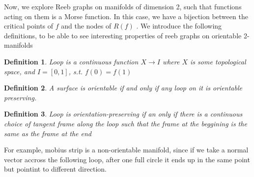 \documentclass[]{article}
\newtheorem{definition}{Definition}
\begin{document}



Now, we explore Reeb graphs on manifolds of dimension 2, such that functions acting on them is a Morse function. In this case, we have a bijection between the critical points of $f$ and the nodes of $R(f)$ . We introduce the following definitions, to be able to see interesting properties of reeb graphs on orientable 2-manifolds
\begin{definition}
    Loop is a continuous function $X \to I$ where $X$ is some topological space, and $I=[0,1]$, s.t. $f(0) = f(1)$
\end{definition}
\begin{definition}
    A surface is orientable if and only if any loop on it is orientable preserving.
\end{definition}
\begin{definition}
    Loop is orientation-preserving if an only if there is a continuous choice of tangent frame along the loop such that the frame at the beggining is the same as the frame at the end
\end{definition}
For example, mobius strip is a non-orientable manifold, since if we take a normal vector accross the following loop, after one full circle it ends up in the same point but pointint to different direction.
\end{document}

